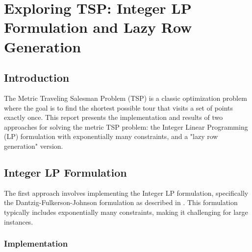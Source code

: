 \chapter{Exploring TSP: Integer LP Formulation and Lazy Row Generation}
\section*{Introduction}

The Metric Traveling Salesman Problem (TSP) is a classic optimization problem where the goal is to find the shortest possible tour that visits a set of points exactly once. This report presents the implementation and results of two approaches for solving the metric TSP problem: the Integer Linear Programming (LP) formulation with exponentially many constraints, and a "lazy row generation" version.

\section*{Integer LP Formulation}

The first approach involves implementing the Integer LP formulation, specifically the Dantzig-Fulkerson-Johnson formulation as described in \cite{dfj-formulation}. This formulation typically includes exponentially many constraints, making it challenging for large instances.
\newpage
\subsection*{Implementation}

